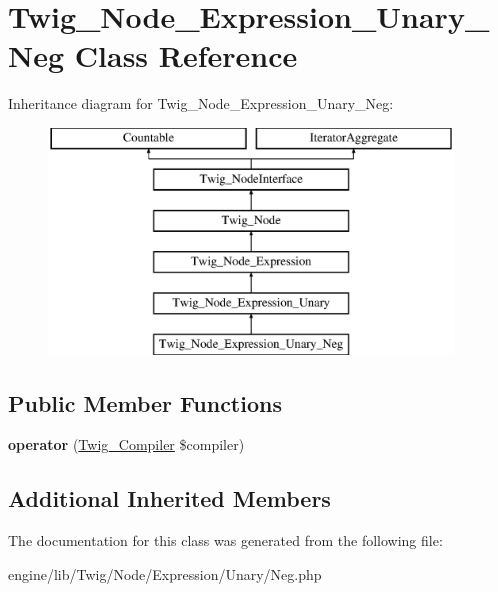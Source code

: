 \hypertarget{class_twig___node___expression___unary___neg}{}\section{Twig\+\_\+\+Node\+\_\+\+Expression\+\_\+\+Unary\+\_\+\+Neg Class Reference}
\label{class_twig___node___expression___unary___neg}
Inheritance diagram for Twig\+\_\+\+Node\+\_\+\+Expression\+\_\+\+Unary\+\_\+\+Neg\+:\begin{figure}[H]
\begin{center}
\leavevmode
\includegraphics[height=6.000000cm]{class_twig___node___expression___unary___neg}
\end{center}
\end{figure}
\subsection*{Public Member Functions}
\begin{DoxyCompactItemize}
\item 
\hypertarget{class_twig___node___expression___unary___neg_af77318ec88d5f8a508684970a150b670}{}{\bfseries operator} (\hyperlink{class_twig___compiler}{Twig\+\_\+\+Compiler} \$compiler)\label{class_twig___node___expression___unary___neg_af77318ec88d5f8a508684970a150b670}

\end{DoxyCompactItemize}
\subsection*{Additional Inherited Members}


The documentation for this class was generated from the following file\+:\begin{DoxyCompactItemize}
\item 
engine/lib/\+Twig/\+Node/\+Expression/\+Unary/Neg.\+php\end{DoxyCompactItemize}
